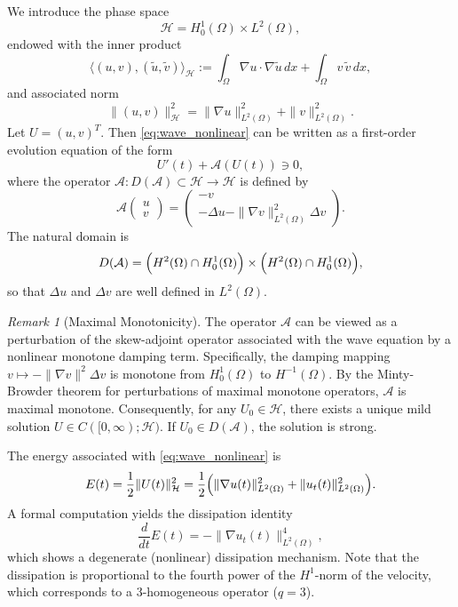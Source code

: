 \documentclass[11pt,reqno]{amsart}
\theoremstyle{remark}
\newtheorem{remark}[theorem]{Remark}
\begin{document}
We introduce the phase space
\[
\mathcal{H} = H_0^1(\Omega)\times L^2(\Omega),
\]
endowed with the inner product
\[
\langle (u,v),(\tilde u,\tilde v)\rangle_{\mathcal H}
  := \int_\Omega \nabla u\cdot \nabla \tilde u\,dx + \int_\Omega v\,\tilde v\,dx,
\]
and associated norm
\[
\|(u,v)\|_{\mathcal H}^2 = \|\nabla u\|_{L^2(\Omega)}^2 + \|v\|_{L^2(\Omega)}^2.
\]
Let $U=(u,v)^T$. Then \eqref{eq:wave_nonlinear} can be written as a first-order
evolution equation of the form
\[
U'(t) + \mathcal A(U(t)) \ni 0,
\]
where the operator $\mathcal A : D(\mathcal A)\subset \mathcal H \to \mathcal H$ is defined by
\begin{equation}\label{def:operatorA}
\mathcal A
\begin{pmatrix} u \\ v \end{pmatrix}
=
\begin{pmatrix}
 -v\\
 -\Delta u - \|\nabla v\|_{L^2(\Omega)}^2 \Delta v
\end{pmatrix}.
\end{equation}
The natural domain is
\[
D(\mathcal A)=
\Bigl(H^2(\Omega)\cap H_0^1(\Omega)\Bigr)\times
\Bigl(H^2(\Omega)\cap H_0^1(\Omega)\Bigr),
\]
so that $\Delta u$ and $\Delta v$ are well defined in $L^2(\Omega)$.

\begin{remark}[Maximal Monotonicity]
The operator $\mathcal{A}$ can be viewed as a perturbation of the skew-adjoint operator associated with the wave equation by a nonlinear monotone damping term. Specifically, the damping mapping $v \mapsto -\|\nabla v\|^2 \Delta v$ is monotone from $H_0^1(\Omega)$ to $H^{-1}(\Omega)$. By the Minty-Browder theorem for perturbations of maximal monotone operators, $\mathcal{A}$ is maximal monotone. Consequently, for any $U_0 \in \mathcal{H}$, there exists a unique mild solution $U \in C([0,\infty); \mathcal{H})$. If $U_0 \in D(\mathcal{A})$, the solution is strong.
\end{remark}

The energy associated with \eqref{eq:wave_nonlinear} is
\[
E(t)=\frac12\|U(t)\|_{\mathcal H}^2
=\frac12\Bigl(\|\nabla u(t)\|_{L^2(\Omega)}^2+\|u_t(t)\|_{L^2(\Omega)}^2\Bigr).
\]
A formal computation yields the dissipation identity
\begin{equation}\label{est:energy_dissipation}
\frac{d}{dt}E(t) = -\|\nabla u_t(t)\|_{L^2(\Omega)}^4,
\end{equation}
which shows a degenerate (nonlinear) dissipation mechanism. Note that the dissipation is proportional to the fourth power of the $H^1$-norm of the velocity, which corresponds to a 3-homogeneous operator ($q=3$).
\end{document}
